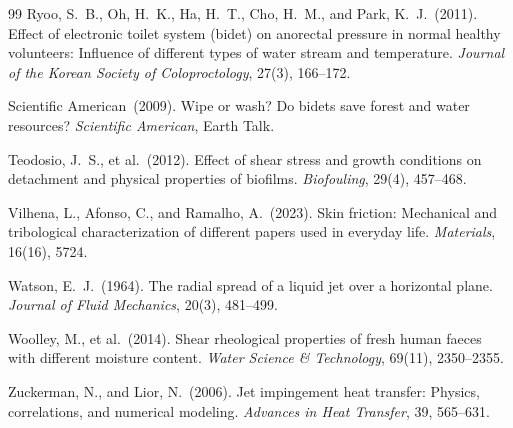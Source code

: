 \documentclass[aps,prfluids,reprint,amsmath,amssymb,floatfix]{revtex4-2}
\begin{document}
\begin{thebibliography}{99}
Ryoo, S.~B., Oh, H.~K., Ha, H.~T., Cho, H.~M., and Park, K.~J.\ (2011).
Effect of electronic toilet system (bidet) on anorectal pressure in normal
healthy volunteers: Influence of different types of water stream and
temperature.
\textit{Journal of the Korean Society of Coloproctology}, 27(3), 166--172.

Scientific American\ (2009).
Wipe or wash? Do bidets save forest and water resources?
\textit{Scientific American}, Earth Talk.

Teodosio, J.~S., et al.\ (2012).
Effect of shear stress and growth conditions on detachment and physical
properties of biofilms.
\textit{Biofouling}, 29(4), 457--468.

Vilhena, L., Afonso, C., and Ramalho, A.\ (2023).
Skin friction: Mechanical and tribological characterization of different
papers used in everyday life.
\textit{Materials}, 16(16), 5724.

Watson, E.~J.\ (1964).
The radial spread of a liquid jet over a horizontal plane.
\textit{Journal of Fluid Mechanics}, 20(3), 481--499.

Woolley, M., et al.\ (2014).
Shear rheological properties of fresh human faeces with different moisture
content.
\textit{Water Science \& Technology}, 69(11), 2350--2355.

Zuckerman, N., and Lior, N.\ (2006).
Jet impingement heat transfer: Physics, correlations, and numerical
modeling.
\textit{Advances in Heat Transfer}, 39, 565--631.

\end{thebibliography}
\end{document}
